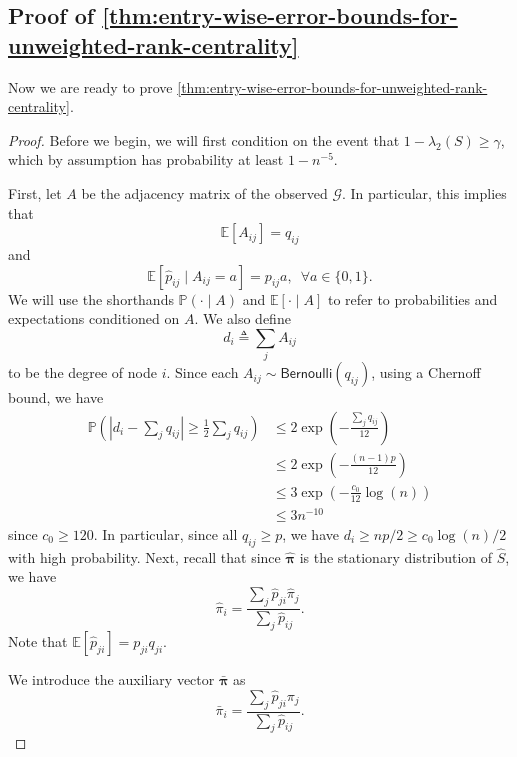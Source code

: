 \documentclass[sigconf,nonacm,pbalance]{acmart}
\begin{document}
\subsection[Proof of Theorem 3.1]{Proof of \cref{thm:entry-wise-error-bounds-for-unweighted-rank-centrality}} \label{app:unweighted-linf-proof}
Now we are ready to prove \cref{thm:entry-wise-error-bounds-for-unweighted-rank-centrality}.
\begin{proof}
Before we begin, we will first condition on the event that $1-\lambda_2(S)\geq \gamma$, which by assumption has probability at least $1-n^{-5}$.

First, let $A$ be the adjacency matrix of the observed $\mathcal{G}$. In particular, this implies that
\begin{equation}
    \mathbb{E}[A_{ij}] = q_{ij}
\end{equation}
and
\begin{equation}
    \mathbb{E}[\hat{p}_{ij} \mid A_{ij} = a] = p_{ij} a,\enspace \forall a \in \{0, 1\}.
\end{equation}
We will use the shorthands $\mathbb{P}(\cdot \mid A)$ and $\mathbb{E}[\cdot \mid A]$ to refer to probabilities and expectations conditioned on $A$. We also define
\begin{equation}
    d_i \triangleq \sum_{j} A_{ij}
\end{equation}
to be the degree of node $i$. Since each $A_{ij}\sim \textsf{Bernoulli}(q_{ij})$, using a Chernoff bound, we have
\begin{align}
\mathbb{P}\left(\left|d_i-\sum_j q_{ij}\right| \geq \frac{1}{2} \sum_j q_{ij}\right) &\leq 2\exp\left(-\frac{\sum_j q_{ij}}{12}\right) \\
&\leq 2 \exp\left(-\frac{(n-1)p}{12}\right) \\
&\leq 3 \exp\left(-\frac{c_0}{12} \log(n)\right) \\&\leq 3n^{-10} \label{eq:di-bounds}
\end{align}
since $c_0\geq 120$. In particular, since all $q_{ij}\geq p$, we have $d_i \geq np/2 \geq c_0 \log(n)/2$ with high probability.
Next, recall that since $\hat{\bm{\pi}}$ is the stationary distribution of $\hat{S}$, we have
\begin{equation}
\hat{\pi}_i = \frac{\sum_j \hat{p}_{ji} \hat{\pi}_j}{\sum_j \hat{p}_{ij}}.
\end{equation}
Note that $\mathbb{E}[\hat{p}_{ji}]=p_{ji} q_{ji}$.

We introduce the auxiliary vector $\bar{\bm{\pi}}$ as
\begin{equation}
\bar{\pi}_i = \frac{\sum_j \hat{p}_{ji} \pi_j}{\sum_j \hat{p}_{ij}}.
\end{equation}


\end{proof}
\end{document}

